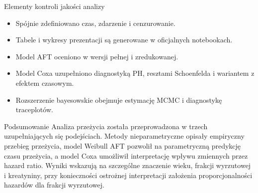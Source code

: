 \documentclass[aspectratio=169]{beamer}
\begin{document}
\begin{frame}{Elementy kontroli jakości analizy}
\begin{itemize}
\item Spójnie zdefiniowano czas, zdarzenie i cenzurowanie.
\item Tabele i wykresy prezentacji są generowane w oficjalnych notebookach.
\item Model AFT oceniono w wersji pełnej i zredukowanej.
\item Model Coxa uzupełniono diagnostyką PH, resztami Schoenfelda i wariantem z efektem czasowym.
\item Rozszerzenie bayesowskie obejmuje estymację MCMC i diagnostykę traceplotów.
\end{itemize}
\end{frame}
\begin{frame}{Podsumowanie}
Analiza przeżycia została przeprowadzona w trzech uzupełniających się podejściach. Metody nieparametryczne opisały empiryczny przebieg przeżycia, model Weibull AFT pozwolił na parametryczną predykcję czasu przeżycia, a model Coxa umożliwił interpretację wpływu zmiennych przez hazard ratio. Wyniki wskazują na szczególne znaczenie wieku, frakcji wyrzutowej i kreatyniny, przy konieczności ostrożnej interpretacji założenia proporcjonalności hazardów dla frakcji wyrzutowej.
\end{frame}
\end{document}
